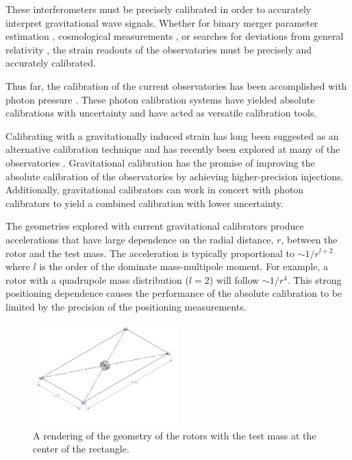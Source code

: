 \documentclass[superscriptaddress, twocolumn, prd]{revtex4-1}
\begin{document}
These interferometers must be precisely calibrated in order to accurately interpret gravitational wave signals. Whether for binary merger parameter estimation \cite{abbott2020population}, cosmological measurements \cite{abbott2021gravitational, ligo2017gravitational}, or searches for deviations from general relativity \cite{abbott2020tests}, the strain readouts of the observatories must be precisely and accurately calibrated.

Thus far, the calibration of the current observatories has been accomplished with photon pressure \cite{PCal}. These photon calibration systems have yielded absolute calibrations with  uncertainty and have acted as versatile calibration tools. 

Calibrating with a gravitationally induced strain has long been suggested as an alternative calibration technique \cite{hirakawa1980dynamical, kuroda1985experimental, mio1987experimental, astone1991evaluation, astone1998experimental, Matone_2007} and has recently been explored at many of the observatories \cite{Estevez_2018, estevez2021newtonian, PhysRevD.98.022005, ncal}. Gravitational calibration has the promise of improving the absolute calibration of the observatories by achieving higher-precision injections. Additionally, gravitational calibrators can work in concert with photon calibrators to yield a combined calibration with lower uncertainty.

The geometries explored with current gravitational calibrators \cite{Estevez_2018, estevez2021newtonian, PhysRevD.98.022005, ncal} produce accelerations that have large dependence on the radial distance, $r$, between the rotor and the test mass. The acceleration is typically proportional to $\sim1/r^{l+2}$ where $l$ is the order of the dominate mass-multipole moment. For example, a rotor with a quadrupole mass distribution ($l=2$) will follow $\sim1/r^4$. This strong positioning dependence causes the performance of the absolute calibration to be limited by the precision of the positioning measurements. 

\begin{figure}[!h]
\centering \includegraphics[width=0.5\textwidth]{Super4_Model.pdf}
\caption{A rendering of the geometry of the rotors with the test mass at the center of the rectangle.}
\label{cad} 
\end{figure}
\end{document}
